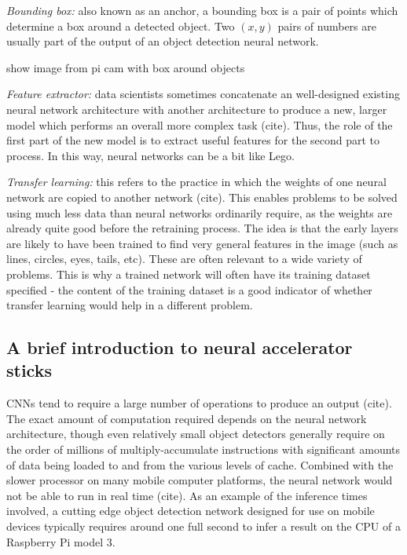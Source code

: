 \textit{Bounding box:} also known as an anchor, a bounding box is a pair of points which determine a box around a detected object. Two $(x, y)$ pairs of numbers are usually part of the output of an object detection neural network.

{\Huge \color{red} show image from pi cam with box around objects}

\textit{Feature extractor:} data scientists sometimes concatenate an well-designed existing neural network architecture with another architecture to produce a new, larger model which performs an overall more complex task {\color{red} (cite)}. Thus, the role of the first part of the new model is to extract useful features for the second part to process. In this way, neural networks can be a bit like Lego.

\textit{Transfer learning:} this refers to the practice in which the weights of one neural network are copied to another network {\color{red} (cite)}. This enables problems to be solved using much less data than neural networks ordinarily require, as the weights are already quite good before the retraining process. The idea is that the early layers are likely to have been trained to find very general features in the image (such as lines, circles, eyes, tails, etc). These are often relevant to a wide variety of problems. This is why a trained network will often have its training dataset specified - the content of the training dataset is a good indicator of whether transfer learning would help in a different problem.











\subsection{A brief introduction to neural accelerator sticks}
CNNs tend to require a large number of operations to produce an output {\color{red} (cite)}. The exact amount of computation required depends on the neural network architecture, though even relatively small object detectors generally require on the order of millions of multiply-accumulate instructions with significant amounts of data being loaded to and from the various levels of cache. Combined with the slower processor on many mobile computer platforms, the neural network would not be able to run in real time{\color{red} (cite)}. As an example of the inference times involved, a cutting edge object detection network designed for use on mobile devices typically requires around one full second to infer a result on the CPU of a Raspberry Pi model 3.

